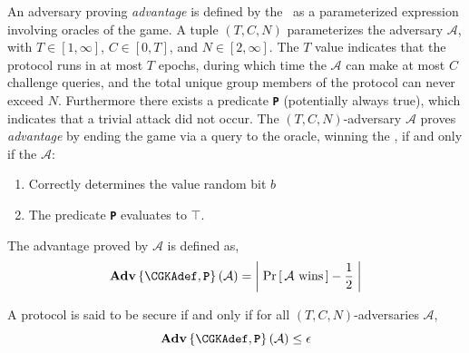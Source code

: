 An adversary proving \emph{advantage} is defined by the \CGKAsec\ as a parameterized expression involving oracles of the game.
A tuple \((T, C, N)\) parameterizes the adversary \(\mathcal{A}\), with \(T \in \left[1, \infty \right]\), \(C \in \left[0, T \right]\), and \(N \in \left[2, \infty \right]\).
The \(T\) value indicates that the protocol runs in at most \(T\) epochs, during which time the \(\mathcal{A}\) can make at most \(C\) challenge queries, and the total unique group members of the protocol can never exceed \(N\).
Furthermore there exists a predicate \textbf{\texttt{P}} (potentially always true), which indicates that a trivial attack did not occur.
The \((T, C, N)\)-adversary \(\mathcal{A}\) proves \emph{advantage} by ending the game via a query to the  oracle, winning the \CGKAsec, if and only if the \(\mathcal{A}\):

\begin{enumerate}
\item Correctly determines the value random bit \(b\)
\item The predicate \textbf{\texttt{P}} evaluates to \(\top\).
\end{enumerate}
\vspace{\parsep}

\begin{definition}\label{def:CGKA-Advantage}
The advantage proved by $\mathcal{A}$ is defined as,
\[ \normalfont{\textbf{Adv}}\left\{\CGKAdef,\textbf{\texttt{P}}\right\}(\mathcal{A})  = \left|\; \Pr\left[ \,\mathcal{A}\text{ wins}\, \right] - \frac{1}{2} \;\right| \]
\end{definition}

\begin{definition}\label{def:CGKA-Security}
A  protocol is said to be secure if and only if for all $(T, C, N)$-adversaries $\mathcal{A}$,
\[ \normalfont\textbf{Adv}\left\{\CGKAdef,\textbf{\texttt{P}}\right\}(\mathcal{A}) \leq \epsilon \]
\end{definition}

